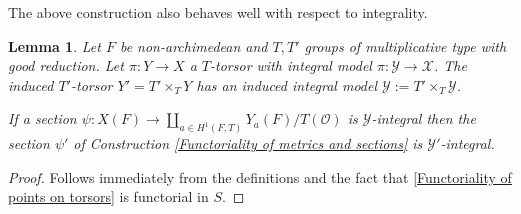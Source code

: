 \documentclass[a4paper,11pt,reqno]{amsart}
\newtheorem{lemma}[theorem]{Lemma}
\theoremstyle{definition}
\begin{document}
The above construction also behaves well with respect to integrality.
\begin{lemma}
	Let $F$ be non-archimedean and $T, T'$ groups of multiplicative type with good reduction. Let $\pi: Y \to X$ a $T$-torsor with integral model $\pi: \mathcal{Y} \to \mathcal{X}$. The induced $T'$-torsor $Y' = T' \times_T Y$ has an induced integral model $\mathcal{Y} := T' \times_T \mathcal{Y}$.
	
	If a section $\psi: X(F) \to \coprod_{a \in H^1(F, T)} Y_{a}(F)/T(\mathcal{O})$ is $\mathcal{Y}$-integral then the section $\psi'$ of Construction \ref{Functoriality of metrics and sections} is $\mathcal{Y}'$-integral.
	\label{Integrality of metrics behaves well with respect to functoriality}
\end{lemma}
\begin{proof}
	Follows immediately from the definitions and the fact that \eqref{Functoriality of points on torsors} is functorial in $S$.
\end{proof}
\end{document}
